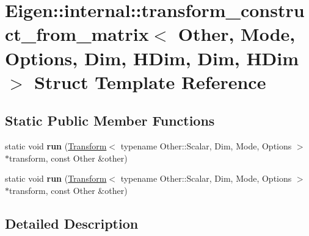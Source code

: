 \hypertarget{struct_eigen_1_1internal_1_1transform__construct__from__matrix_3_01_other_00_01_mode_00_01_optio2861b11cb783feb790ab70300c43bf0a}{}\section{Eigen\+:\+:internal\+:\+:transform\+\_\+construct\+\_\+from\+\_\+matrix$<$ Other, Mode, Options, Dim, H\+Dim, Dim, H\+Dim $>$ Struct Template Reference}
\label{struct_eigen_1_1internal_1_1transform__construct__from__matrix_3_01_other_00_01_mode_00_01_optio2861b11cb783feb790ab70300c43bf0a}
\subsection*{Static Public Member Functions}
\begin{DoxyCompactItemize}
\item 
\mbox{\label{struct_eigen_1_1internal_1_1transform__construct__from__matrix_3_01_other_00_01_mode_00_01_optio2861b11cb783feb790ab70300c43bf0a_a57c65cb53061fa3f5192bea43e7a79a6}} 
static void {\bfseries run} (\hyperlink{group___geometry___module_class_eigen_1_1_transform}{Transform}$<$ typename Other\+::\+Scalar, Dim, Mode, Options $>$ $\ast$transform, const Other \&other)
\item 
\mbox{\label{struct_eigen_1_1internal_1_1transform__construct__from__matrix_3_01_other_00_01_mode_00_01_optio2861b11cb783feb790ab70300c43bf0a_a57c65cb53061fa3f5192bea43e7a79a6}} 
static void {\bfseries run} (\hyperlink{group___geometry___module_class_eigen_1_1_transform}{Transform}$<$ typename Other\+::\+Scalar, Dim, Mode, Options $>$ $\ast$transform, const Other \&other)
\end{DoxyCompactItemize}


\subsection{Detailed Description}

